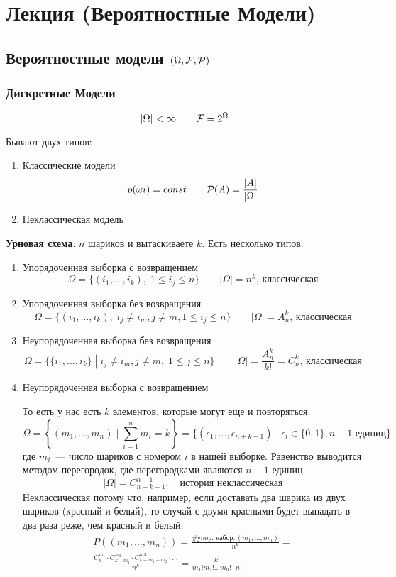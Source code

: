\section{Лекция (Вероятностные Модели)}

\subsection{Вероятностные модели $(\Omega, \mathcal{F}, \mathcal{P})$}

\subsubsection{Дискретные Модели}
\[ |\Omega| < \infty \qquad \mathcal{F} = 2^\Omega\]

Бывают двух типов:
\begin{enumerate}
    \item Классические модели
        \[ p(\omega i) = const \qquad \mathcal{P} (A) = \frac{|A|}{|\Omega|} \]
    \item Неклассическая модель
\end{enumerate}

\textbf{Урновая схема}: $n$ шариков и вытаскиваете $k$. Есть несколько типов:
\begin{enumerate}
\item Упорядоченная выборка с возвращением
    \[\Omega = \{(i_1, \ldots, i_k), \; 1 \leq i_j \leq n\} \qquad |\Omega| = n^k\text{, классическая}\]

\item Упорядоченная выборка без возвращения
    \[\Omega = \{(i_1, \ldots, i_k), \; i_j \neq i_m, j \neq m, 1 \leq i_j \leq n\} \qquad |\Omega| = A^k_n\text{, классическая}\]

\item Неупорядоченная выборка без возвращения
    \[ \Omega = \{ \{i_1, \ldots, i_k\} \;|\; i_j \neq i_m, j\neq m, \; 1\leq j \leq n\} \qquad |\Omega| = \frac{A_n^k}{k!}=C_n^k\text{, классическая} \]

\item Неупорядоченная выборка с возвращением

    То есть у нас есть $k$ элементов, которые могут еще и повторяться.
    \[ \Omega = \left\{ (m_1, \ldots, m_n) \;|\; \sum_{i=1}^nm_i=k\right\} = \{(\epsilon_1,\ldots, \epsilon_{n+k-1}) \;|\; \epsilon_i \in \{0,1\}, n-1\text{ единиц}\} \]
где $m_i$~--- число шариков с номером  $i$ в нашей выборке. Равенство выводится методом перегородок, где перегородками являются $n-1$ единиц.
\[ |\Omega| =  C^{n-1}_{n+k-1}, \quad \text{история неклассическая} \]
Неклассическая потому что, например, если доставать два шарика из двух шариков (красный и белый), то случай с двумя красными будет выпадать в два раза реже, чем красный и белый.
\begin{gather*}
P((m_1, \ldots, m_n))  = \frac{\text{\#упор. набор}: (m_1,\ldots,m_n)}{n^k} =\\
\frac{C_k^{m_1}\cdot C_{k-m_1}^{m_2} \cdot C_{k-m_1-m_2}^{m3}\cdot \ldots}{n^k} = 
\frac{k!}{m_1!m_2!\ldots m_n!\cdot n!} 
\end{gather*}

\end{enumerate}

